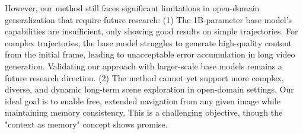 However, our method still faces significant limitations in open-domain generalization that require future research:
(1) The 1B-parameter base model's capabilities are insufficient, only showing good results on simple trajectories. For complex trajectories, the base model struggles to generate high-quality content from the initial frame, leading to unacceptable error accumulation in long video generation. Validating our approach with larger-scale base models remains a future research direction.
(2) The method cannot yet support more complex, diverse, and dynamic long-term scene exploration in open-domain settings. Our ideal goal is to enable free, extended navigation from any given image while maintaining memory consistency. This is a challenging objective, though the "context as memory" concept shows promise.




